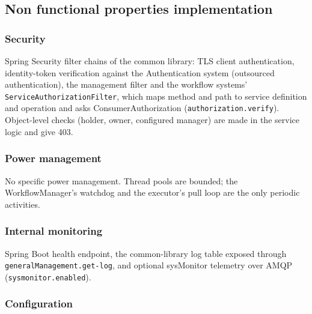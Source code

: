 \documentclass[a4paper]{arrowhead}
\begin{document}
\subsection{Non functional properties implementation}
\subsubsection{Security}
Spring Security filter chains of the common library: TLS client authentication, identity-token verification against
the Authentication system (outsourced authentication), the management filter and the workflow systems'
\texttt{ServiceAuthorizationFilter}, which maps method and path to service definition and operation and asks
ConsumerAuthorization (\texttt{authorization.verify}). Object-level checks (holder, owner, configured manager) are made in
the service logic and give 403.
\subsubsection{Power management}
No specific power management. Thread pools are bounded; the WorkflowManager's watchdog and the executor's pull loop are
the only periodic activities.
\subsubsection{Internal monitoring}
Spring Boot health endpoint,
the common-library log table exposed through \texttt{generalManagement.get-log}, and optional sysMonitor telemetry over
AMQP (\texttt{sysmonitor.enabled}).
\subsubsection{Configuration}
\end{document}
